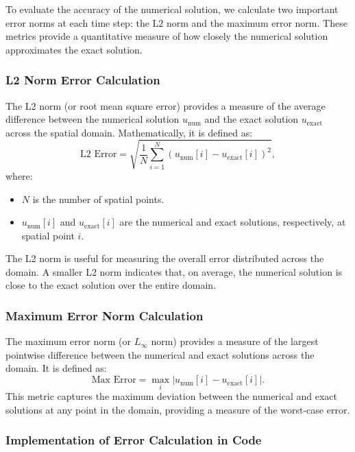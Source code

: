 \documentclass{article}
\begin{document}
		 To evaluate the accuracy of the numerical solution, we calculate two important error norms at each time step: the L2 norm and the maximum error norm. These metrics provide a quantitative measure of how closely the numerical solution approximates the exact solution.
		 
		 \subsubsection{L2 Norm Error Calculation}
		 
		 The L2 norm (or root mean square error) provides a measure of the average difference between the numerical solution \( u_{\text{num}} \) and the exact solution \( u_{\text{exact}} \) across the spatial domain. Mathematically, it is defined as:
		 \[
		 \text{L2 Error} = \sqrt{\frac{1}{N} \sum_{i=1}^{N} \left( u_{\text{num}}[i] - u_{\text{exact}}[i] \right)^2},
		 \]
		 where:
		 \begin{itemize}
		 	\item \( N \) is the number of spatial points.
		 	\item \( u_{\text{num}}[i] \) and \( u_{\text{exact}}[i] \) are the numerical and exact solutions, respectively, at spatial point \( i \).
		 \end{itemize}
		 The L2 norm is useful for measuring the overall error distributed across the domain. A smaller L2 norm indicates that, on average, the numerical solution is close to the exact solution over the entire domain.
		 
		 \subsubsection{Maximum Error Norm Calculation}
		 
		 The maximum error norm (or \( L_\infty \) norm) provides a measure of the largest pointwise difference between the numerical and exact solutions across the domain. It is defined as:
		 \[
		 \text{Max Error} = \max_{i} \left| u_{\text{num}}[i] - u_{\text{exact}}[i] \right|.
		 \]
		 This metric captures the maximum deviation between the numerical and exact solutions at any point in the domain, providing a measure of the worst-case error.
		 
		 \subsubsection{Implementation of Error Calculation in Code}
		 
\end{document}
